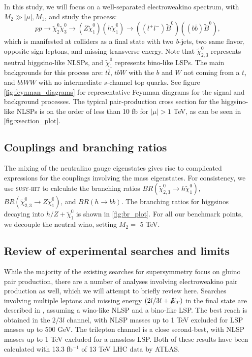 In this study, we will focus on a well-separated electroweakino spectrum, with $M_2 \gg |\mu|,M_1$, and study the process:
\[pp\rightarrow \widetilde{\chi}_{2}^{0}\widetilde{\chi}_{3}^{0}\rightarrow (Z\widetilde{\chi}_1^{0})(h\widetilde{\chi}_1^{0})\rightarrow ((l^+l^-)\widetilde{B}^{0})((b\overline{b})\widetilde{B}^0),\]
which is manifested at colliders as a final state with two \emph{b}-jets, two same flavor, opposite sign leptons, and missing transverse energy. Note that $\widetilde{\chi}_{2,3}^0$ represents neutral higgsino-like NLSPs, and $\widetilde{\chi}_1^0$ represents bino-like LSPs. The main backgrounds for this process are: $t\overline{t}$, $tbW$ with the $b$ and $W$ not coming from a $t$, and $bbWW$ with no intermediate $s$-channel top quarks. See figure \ref{fig:feynman_diagrams} for representative Feynman diagrams for the signal and background processes. The typical pair-production cross section for the higgsino-like NLSPs is on the order of less than 10 fb for $|\mu|>1$ TeV, as can be seen in \autoref{fig:xsection_plot}.  

\subsection{Couplings and branching ratios}

The mixing of the neutralino gauge eigenstates gives rise to complicated expressions for the couplings involving the mass eigenstates. For consistency, we use \textsc{susy-hit} \cite{Djouadi:2006bz} to calculate the branching ratios $BR(\widetilde{\chi}_{2,3}^0\rightarrow h\widetilde{\chi}_1^0)$, $BR(\widetilde{\chi}_{2,3}^0\rightarrow Z\widetilde{\chi}_1^0)$, and $BR(h\rightarrow bb)$. The branching ratios for higgsinos decaying into $h/Z + \widetilde{\chi}_1^0$ is shown in \autoref{fig:br_plot}. For all our benchmark points, we decouple the neutral wino, setting $M_2 = $ 5 TeV.

\subsection{Review of experimental searches and limits}

While the majority of the existing searches for supersymmetry focus on gluino pair production, there are a number of analyses involving electroweakino pair production as well, which we will attempt to briefly review here. 
Searches involving multiple leptons and missing energy $(2l/3l+\slashed{E}_T)$ in the final state are described in \citep{ATLAS:2016uwq,Khachatryan:2014qwa,Chatrchyan:2012pka}, assuming a wino-like NLSP and a bino-like LSP. The best reach is obtained in the $2/3l$ channel, with NLSP masses up to 1 TeV excluded for LSP masses up to 500 GeV. The trilepton channel is a close second-best, with NLSP masses up to 1 TeV excluded for a massless LSP. Both of these results have been calculated with 13.3 fb$^{-1}$ of 13 TeV LHC data by ATLAS. 

